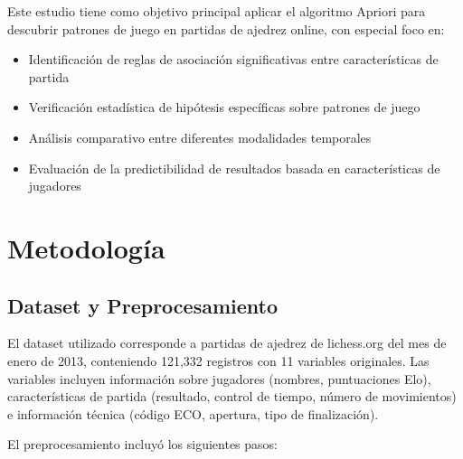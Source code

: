 \documentclass[runningheads]{llncs}
\begin{document}
Este estudio tiene como objetivo principal aplicar el algoritmo Apriori para descubrir patrones de juego en partidas de ajedrez online, con especial foco en:

\begin{itemize}
\item Identificación de reglas de asociación significativas entre características de partida
\item Verificación estadística de hipótesis específicas sobre patrones de juego
\item Análisis comparativo entre diferentes modalidades temporales
\item Evaluación de la predictibilidad de resultados basada en características de jugadores
\end{itemize}

\section{Metodología}

\subsection{Dataset y Preprocesamiento}

El dataset utilizado corresponde a partidas de ajedrez de lichess.org del mes de enero de 2013, conteniendo 121,332 registros con 11 variables originales. Las variables incluyen información sobre jugadores (nombres, puntuaciones Elo), características de partida (resultado, control de tiempo, número de movimientos) e información técnica (código ECO, apertura, tipo de finalización).

El preprocesamiento incluyó los siguientes pasos:
\end{document}
